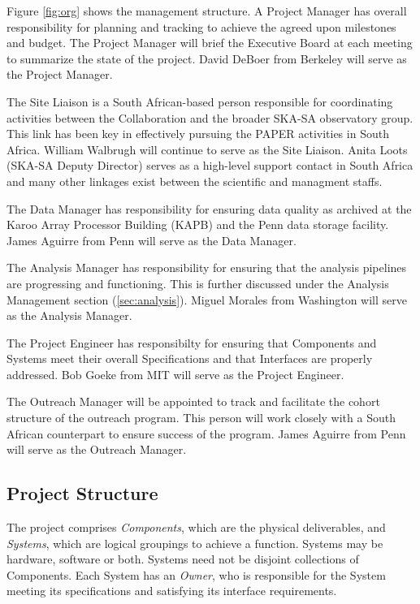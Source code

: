 \documentclass[preprint]{aastex}
\begin{document}
Figure \ref{fig:org} shows the management structure.   A Project Manager has
overall responsibility for planning and tracking to achieve the agreed upon
milestones and budget. The Project Manager will brief the Executive Board at each
meeting to summarize the state of the project.  David DeBoer from Berkeley will serve
as the Project Manager.

The Site Liaison is a South African-based person responsible for coordinating activities
between the Collaboration and the broader SKA-SA observatory group.  This link has 
been key in effectively pursuing the PAPER activities in South Africa.  William Walbrugh
will continue to serve as the Site Liaison.  Anita Loots (SKA-SA Deputy Director) serves as a high-level
support contact in South Africa and many other linkages exist between the scientific and managment staffs.

The Data Manager has responsibility for ensuring data quality as archived at the Karoo Array Processor 
Building (KAPB) and the Penn data storage facility.  James Aguirre from Penn will serve as the Data Manager.

The Analysis Manager has responsibility for ensuring that the analysis pipelines are progressing and functioning.
This is further discussed under the Analysis Management section (\ref{sec:analysis}).
Miguel Morales from Washington will serve as the Analysis Manager.

The Project Engineer has responsibilty for ensuring that Components and Systems meet their overall
Specifications and that Interfaces are properly addressed.  Bob Goeke from MIT will serve as the
Project Engineer.

The Outreach Manager will be appointed to track and facilitate the cohort structure of the outreach program.
This person will work closely with a South African counterpart to ensure success of the program.    James
Aguirre from Penn will serve as the Outreach Manager.

\subsection{Project Structure}
The project comprises {\em Components}, which are the physical deliverables, and {\em Systems},
which are logical groupings to achieve a function. Systems may be hardware, software
or both. Systems need not be disjoint collections of Components. Each System has an
{\em Owner}, who is responsible for the System meeting its specifications and satisfying
its interface requirements.
\end{document}
